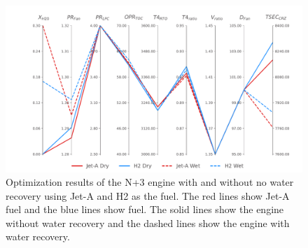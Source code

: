 \documentclass[conf]{new-aiaa}
\begin{document}
\begin{figure}[hbt!]
    \centering
    \includegraphics[width=1.0\textwidth]{N3_parallel_coords.pdf}
    \caption{Optimization results of the N+3 engine with and without no water recovery using Jet-A and H2 as the fuel.
        The red lines show Jet-A fuel and the blue lines show  fuel.
        The solid lines show the engine without water recovery and the dashed lines show the engine with water recovery.}
    \label{fig:parallel_coords}
\end{figure}
\end{document}
